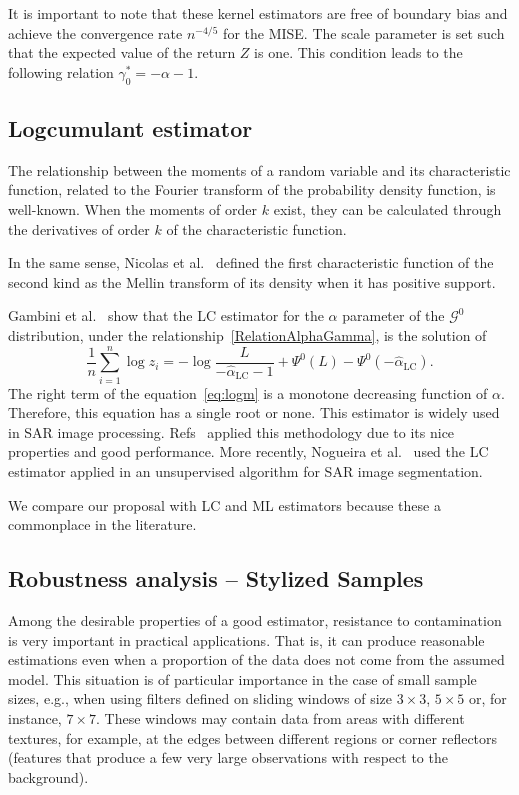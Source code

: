 \documentclass[twocolumn]{svjour3}
\begin{document}
It is important to note that these kernel estimators are free of boundary bias and achieve the convergence rate $n^{-4/5}$ for the MISE.
The scale parameter is set such that the expected value of the return $Z$ is one. 
This condition leads to the following relation $\gamma_0^*=-\alpha-1$.

\subsection{Logcumulant estimator}\label{lc}

The relationship between the moments of a random variable and its characteristic function, related to the Fourier transform of the probability density function, is well-known. 
When the moments of order $k$ exist, they can be calculated through the derivatives of order $k$ of the characteristic function.

In the same sense, Nicolas et al.~\cite{nicolas2002} defined the first characteristic function of the second kind as the Mellin transform of its density when it has positive support. 

Gambini et al.~\cite{gambini2015} show that the LC estimator for the $\alpha$ parameter of the $\mathcal{G}^0$ distribution, under the relationship~\eqref{RelationAlphaGamma}, is the solution of 
\begin{equation} \label{eq:logm}
\frac{1}{n} \sum_{i=1}^n\log z_i =   -\log \frac{L}{-\widehat\alpha_{\text{{LC}}}-1} + \Psi^0(L) - \Psi^0(-\widehat\alpha_{\text{{LC}}}).
\end{equation}
The right term of the equation~\eqref{eq:logm} is a monotone decreasing function of $\alpha$. Therefore, this equation has a single root or none. 
This estimator is widely used in SAR image processing. 
Refs~\cite{MellinAnalysisPolSAR,BujorTrouveValetNicolas2004,khan2014} applied this methodology due to its nice properties and good performance. 
More recently, Nogueira et al.~\cite{Nogueira2019} used the LC estimator applied in an unsupervised algorithm for SAR image segmentation.

We compare our proposal with LC and ML estimators because these a commonplace in the literature.

\subsection{Robustness analysis -- Stylized Samples}
\label{robustez}
Among the desirable properties of a good estimator, resistance to contamination is very important in practical applications. 
That is, it can produce reasonable estimations even when a proportion of the data does not come from the assumed model. 
This situation is of particular importance in the case of small sample sizes, e.g., when using filters defined on sliding windows of size $3 \times 3$, $5 \times 5$ or, for instance, $7 \times 7$. 
These windows may contain data from areas with different textures, for example, at the edges between different regions or corner reflectors (features that produce a few very large observations with respect to the background).
\end{document}
